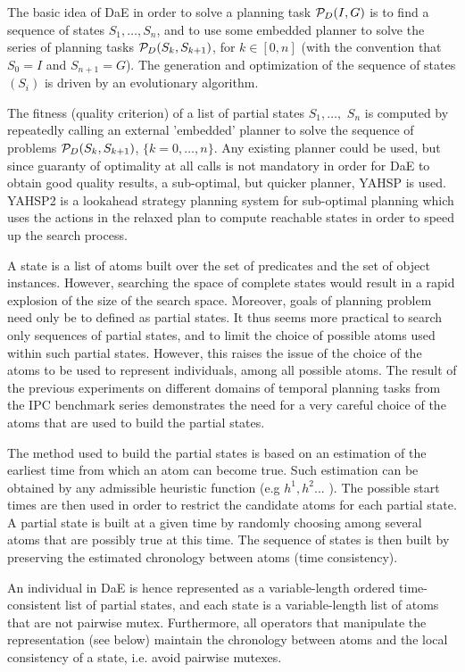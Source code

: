 \documentclass{MYsig-alternate}
\begin{document}
The basic idea of DaE in order to solve a planning task ${\cal P}_D(I,G)$ is to find a sequence of states $S_1, \ldots, S_n$, and to use some embedded planner to solve the series of planning tasks ${\cal P}_D(S_{k},S_{k+1})$, for $k \in [0,n]$ (with the convention that $S_0 = I$ and $S_{n+1} = G$). The generation and optimization of the sequence of states $(S_i)$ is driven by an evolutionary algorithm. 

The fitness (quality criterion) of a list of partial states $S_1, \ldots,$ $S_n$ is computed by repeatedly calling an external 'embedded' planner to solve the sequence of problems ${\cal P}_D(S_{k},S_{k+1})$, $\{k=0,\ldots,n\}$. Any existing planner could be used, but since guaranty of optimality at all calls is not mandatory in order for DaE to obtain good quality results, a sub-optimal, but quicker planner, YAHSP is used. YAHSP2 \cite{V:icaps04} is a lookahead strategy planning system for sub-optimal planning which uses the  actions in the relaxed plan to compute reachable states in order to speed up the search process. 

A state is a list of atoms built over the set of predicates and the set of object instances. However, searching the space of complete states would result in a rapid explosion of the size of the search space. Moreover, goals of planning problem need only be to defined as partial states. It thus seems more practical to search only sequences of partial states, and to limit the choice of possible atoms used within such partial states. However, this raises the issue of the choice of the atoms to be used to represent individuals, among all possible atoms. The result of the previous experiments on different domains of temporal planning tasks from the IPC benchmark series \cite{BibEvoCop2009} demonstrates the need for a very careful choice of the atoms that are used to build the partial states. 

The method used to build the partial states is based on an estimation of the earliest time from which an atom can become true. Such estimation can be obtained by any admissible heuristic function (e.g $h^1,h^2...$ \cite{HaslumGeffner-AIPS-2000}). The possible start times are then used in order to restrict the candidate atoms for each partial state. A partial state is built at a given time by randomly choosing among several atoms that are possibly true at this time. The sequence of states is then built by preserving the estimated chronology between atoms (time consistency).

An individual in DaE is hence represented as a variable-length ordered time-consistent list of partial states, and each state is a variable-length list of atoms that are not pairwise mutex. Furthermore, all operators that manipulate the representation (see below) maintain the chronology between atoms and the local consistency of a state, i.e. avoid pairwise mutexes.
\end{document}
